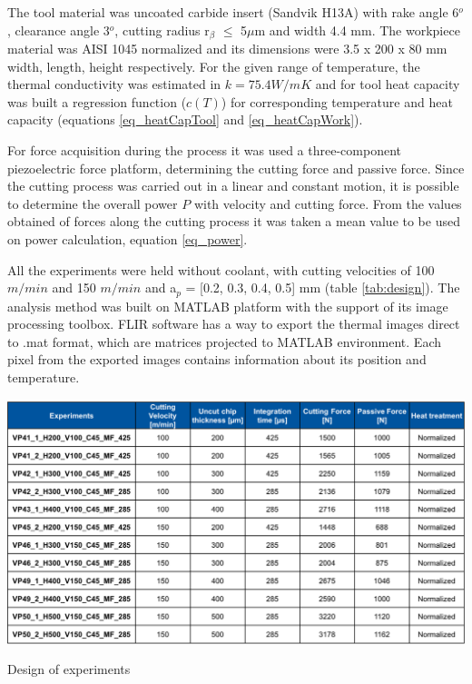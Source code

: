 	The tool material was uncoated carbide insert (Sandvik H13A) with rake angle 6$^{o}$, clearance angle 3$^{o}$, cutting radius r$_{\beta}$ $\le$ 5$\mu$m and width 4.4 mm. The workpiece material was AISI 1045 normalized and its dimensions were 3.5 x 200 x 80 mm width, length, height respectively. For the given range of temperature, the thermal conductivity was estimated in $k = 75.4 W/mK$ and for tool heat capacity was built a regression function ($c(T)$) for corresponding temperature and heat capacity (equations \ref{eq_heatCapTool} and \ref{eq_heatCapWork}).
	
	For force acquisition during the process it was used a three-component piezoelectric force platform, determining the cutting force and passive force. Since the cutting process was carried out in a linear and constant motion, it is possible to determine the overall power $P$ with velocity and cutting force. From the values obtained of forces along the cutting process it was taken a mean value to be used on power calculation, equation \ref{eq_power}. 
	
	All the experiments were held without coolant, with cutting velocities of 100 $m/min$ and 150 $m/min$ and a$_{p}$ = [0.2, 0.3, 0.4, 0.5] mm (table \ref{tab:design}).
	The analysis method was built on MATLAB platform with the support of its image processing toolbox. FLIR software has a way to export the thermal images direct to .mat format, which are matrices projected to MATLAB environment. Each pixel from the exported images contains information about its position and temperature.

	\begin{table}[H]
		\centering
		\captionsetup{justification=centering}
		\includegraphics[scale = 0.6]{Cap3/tabexpset.png}
		\caption{Design of experiments \cite{augspurger2016experimental}}
		\label{tab:design}
	\end{table}

